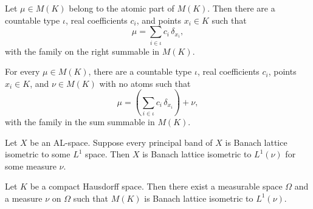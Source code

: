 \begin{theorem}
\label{thm:mofK-exists-sum-dirac-of-mem-atomicPart}
\leanok
{}
Let $\mu \in M(K)$ belong to the atomic part of $M(K)$. Then there
are a countable type $\iota$, real coefficients $c_i$, and points
$x_i \in K$ such that
\[
  \mu = \sum_{i \in \iota} c_i\,\delta_{x_i},
\]
with the family on the right summable in $M(K)$.
\end{theorem}

\begin{theorem}
\label{thm:mofK-exists-sum-dirac-add-noAtoms}
\leanok
{}
For every $\mu \in M(K)$, there are a countable type $\iota$,
real coefficients $c_i$, points $x_i \in K$, and
$\nu \in M(K)$ with no atoms such that
\[
  \mu = \left(\sum_{i \in \iota} c_i\,\delta_{x_i}\right)+\nu,
\]
with the family in the sum summable in $M(K)$.
\end{theorem}

\begin{theorem}
\label{thm:exists-L1-banachLatEquiv-of-principalBandModels}
\leanok
{}
Let $X$ be an AL-space. Suppose every principal band of $X$ is
Banach lattice isometric to some $L^1$ space. Then $X$ is Banach
lattice isometric to $L^1(\nu)$ for some measure $\nu$.
\end{theorem}

\begin{theorem}
\label{thm:mofK-exists-L1-banachLatEquiv}
\leanok
{}
Let $K$ be a compact Hausdorff space. Then there exist a measurable
space $\Omega$ and a measure $\nu$ on $\Omega$ such that $M(K)$ is
Banach lattice isometric to $L^1(\nu)$.
\end{theorem}
